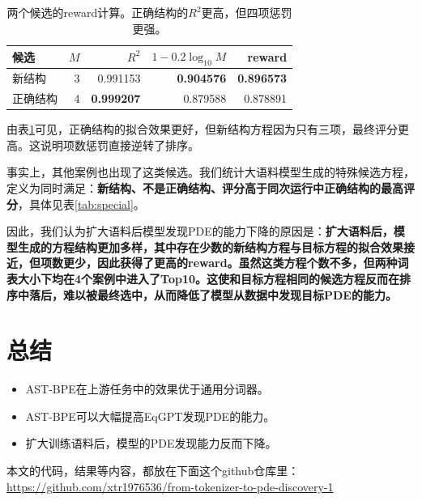 \documentclass[UTF8,fontset=mac,11pt,letterpaper]{ctexart}
\begin{document}
\begin{table}[!htbp]
\caption{两个候选的reward计算。正确结构的$R^2$更高，但四项惩罚更强。}\label{tab:reward}
\centering\small
\begin{tabular*}{\linewidth}{@{\extracolsep{\fill}}lrrrr@{}}\toprule
候选 & $M$ & $R^2$ & $1-0.2\log_{10}M$ & reward\\\midrule
新结构 & 3 & 0.991153 & \textbf{0.904576} & \textbf{0.896573}\\
正确结构 & 4 & \textbf{0.999207} & 0.879588 & 0.878891\\\bottomrule
\end{tabular*}
\end{table}

由表\ref{tab:reward}可见，正确结构的拟合效果更好，但新结构方程因为只有三项，最终评分更高。这说明项数惩罚直接逆转了排序。


事实上，其他案例也出现了这类候选。我们统计大语料模型生成的特殊候选方程，定义为同时满足：\textbf{新结构、不是正确结构、评分高于同次运行中正确结构的最高评分}，具体见表\ref{tab:special}。
\begin{table}[H]
\caption{特殊候选统计。}\label{tab:special}
\centering\small
\end{table}

\enlargethispage{24pt}
\begin{samepage}
因此，我们认为扩大语料后模型发现PDE的能力下降的原因是：\textbf{扩大语料后，模型生成的方程结构更加多样，其中存在少数的新结构方程与目标方程的拟合效果接近，但项数更少，因此获得了更高的reward。虽然这类方程个数不多，但两种词表大小下均在4个案例中进入了Top10。这使和目标方程相同的候选方程反而在排序中落后，难以被最终选中，从而降低了模型从数据中发现目标PDE的能力。}


\section{总结}
\begin{itemize}\setlength{\itemsep}{0pt}\setlength{\parsep}{0pt}
\item AST-BPE在上游任务中的效果优于通用分词器。
\item AST-BPE可以大幅提高EqGPT发现PDE的能力。
\item 扩大训练语料后，模型的PDE发现能力反而下降。
\end{itemize}

\vspace{-8pt}
{\footnotesize 本文的代码，结果等内容，都放在下面这个github仓库里：\\
\url{https://github.com/xtr1976536/from-tokenizer-to-pde-discovery-1}\par}

\end{samepage}
\endgroup
\FloatBarrier
\clearpage
\appendix
\end{document}
